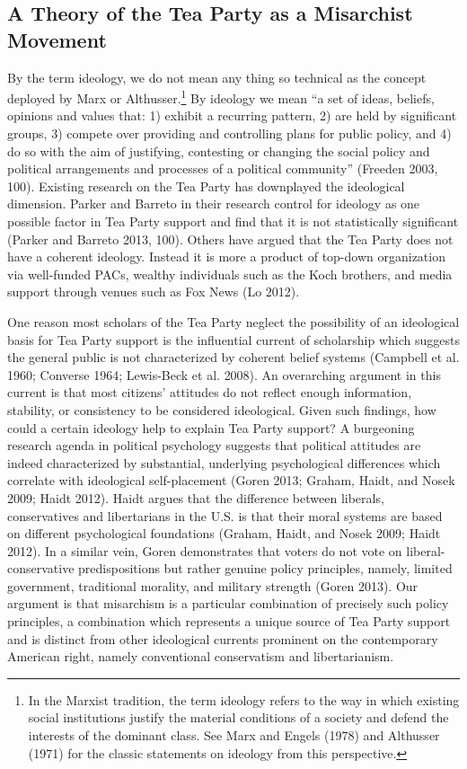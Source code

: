 \documentclass[12pt,]{article}
\begin{document}
\subsection{A Theory of the Tea Party as a Misarchist
Movement}\label{a-theory-of-the-tea-party-as-a-misarchist-movement}

By the term ideology, we do not mean any thing so technical as the
concept deployed by Marx or Althusser.\footnote{In the Marxist
  tradition, the term ideology refers to the way in which existing
  social institutions justify the material conditions of a society and
  defend the interests of the dominant class. See Marx and Engels (1978) and Althusser (1971) for the classic
  statements on ideology from this perspective.} By ideology we mean ``a
set of ideas, beliefs, opinions and values that: 1) exhibit a recurring
pattern, 2) are held by significant groups, 3) compete over providing
and controlling plans for public policy, and 4) do so with the aim of
justifying, contesting or changing the social policy and political
arrangements and processes of a political community'' (Freeden 2003,
100). Existing research on the Tea Party has downplayed the ideological
dimension. Parker and Barreto in their research control for ideology as
one possible factor in Tea Party support and find that it is not
statistically significant (Parker and Barreto 2013, 100). Others have
argued that the Tea Party does not have a coherent ideology. Instead it
is more a product of top-down organization via well-funded PACs, wealthy
individuals such as the Koch brothers, and media support through venues
such as Fox News (Lo 2012).

One reason most scholars of the Tea Party neglect the possibility of an
ideological basis for Tea Party support is the influential current of
scholarship which suggests the general public is not characterized by
coherent belief systems (Campbell et al. 1960; Converse 1964; Lewis-Beck
et al. 2008). An overarching argument in this current is that most
citizens' attitudes do not reflect enough information, stability, or
consistency to be considered ideological. Given such findings, how could
a certain ideology help to explain Tea Party support? A burgeoning
research agenda in political psychology suggests that political
attitudes are indeed characterized by substantial, underlying
psychological differences which correlate with ideological
self-placement (Goren 2013; Graham, Haidt, and Nosek 2009; Haidt 2012).
Haidt argues that the difference between liberals, conservatives and
libertarians in the U.S. is that their moral systems are based on
different psychological foundations (Graham, Haidt, and Nosek 2009;
Haidt 2012). In a similar vein, Goren demonstrates that voters do not
vote on liberal-conservative predispositions but rather genuine policy
principles, namely, limited government, traditional morality, and
military strength (Goren 2013). Our argument is that misarchism is a
particular combination of precisely such policy principles, a
combination which represents a unique source of Tea Party support and is
distinct from other ideological currents prominent on the contemporary
American right, namely conventional conservatism and libertarianism.
\end{document}
